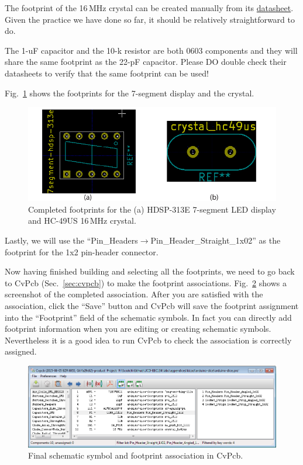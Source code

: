 \documentclass[12pt,letterpaper]{scrartcl}
\begin{document}
The footprint of the 16\,MHz crystal can be created manually from its \href{http://media.digikey.com/pdf/Data\%20Sheets/Citizen\%20PDFs/HC49US.pdf}{datasheet}. Given the practice we have done so far, it should be relatively straightforward to do. 

The 1-uF capacitor and the 10-k resistor are both 0603 components and they will share the same footprint as the 22-pF capacitor. Please DO double check their datasheets to verify that the same footprint can be used!

Fig.~\ref{fig:other-footprints-final} shows the footprints for the 7-segment display and the crystal. 
	\begin{figure}[hp]
		\centering
		\includegraphics{other-footprints-final}
		\caption{Completed footprints for the (a) HDSP-313E 7-segment LED display and HC-49US 16\,MHz crystal.}
		\label{fig:other-footprints-final}
	\end{figure}

Lastly, we will use the ``Pin\_Headers$\rightarrow$Pin\_Header\_Straight\_1x02'' as the footprint for the 1x2 pin-header connector. 

Now having finished building and selecting all the footprints, we need to go back to CvPcb (Sec.~\ref{sec:cvpcb}) to make the footprint associations. Fig.~\ref{fig:cvpcb-final} shows a screenshot of the completed association. After you are satisfied with the association, click the ``Save'' button and CvPcb will save the footprint assignment into the ``Footprint'' field of the schematic symbols. In fact you can directly add footprint information when you are editing or creating schematic symbols. Nevertheless it is a good idea to run CvPcb to check the association is correctly assigned. 

	\begin{figure}[h]
		\centering
		\includegraphics[width=6in]{cvpcb-final}
		\caption{Final schematic symbol and footprint association in CvPcb.}
		\label{fig:cvpcb-final}
	\end{figure}
\end{document}
